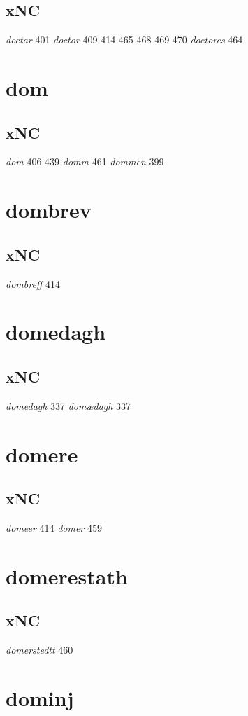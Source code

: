 \documentclass[a4paper,twocolumn]{article}
\begin{document}
\subsection{xNC}
\label{sec:orgc337df4}
\emph{doctar} 401 \emph{doctor} 409 414 465 468 469 470 \emph{doctores} 464 
\section{dom}
\label{sec:orgbae2148}
\subsection{xNC}
\label{sec:orgf5c7c24}
\emph{dom} 406 439 \emph{domm} 461 \emph{dommen} 399 
\section{dombrev}
\label{sec:orgeeddb93}
\subsection{xNC}
\label{sec:org0103e31}
\emph{dombreff} 414 
\section{domedagh}
\label{sec:orgabbce7a}
\subsection{xNC}
\label{sec:orgdf2e735}
\emph{domedagh} 337 \emph{domædagh} 337 
\section{domere}
\label{sec:org00905ec}
\subsection{xNC}
\label{sec:org2833fec}
\emph{domeer} 414 \emph{domer} 459 
\section{domerestath}
\label{sec:org15712d1}
\subsection{xNC}
\label{sec:orgca2471c}
\emph{domerstedtt} 460 
\section{dominj}
\label{sec:org55773da}
\end{document}
